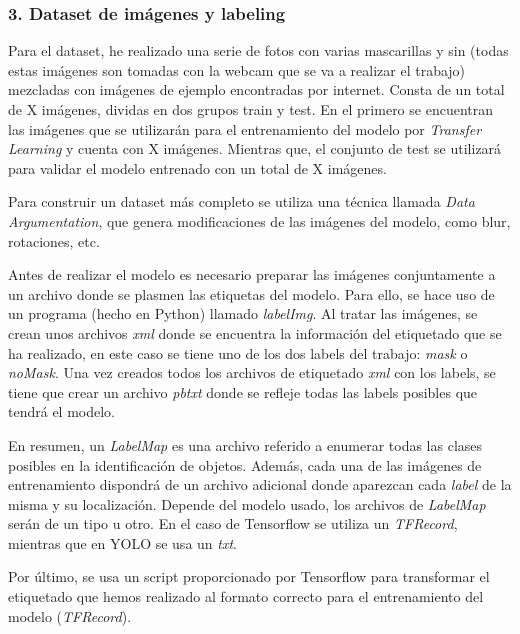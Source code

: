 \vspace{-0.5cm}
\subsubsection*{3. Dataset de imágenes y labeling}
\vspace{-0.7cm}
Para el dataset, he realizado una serie de fotos con varias mascarillas y sin (todas estas imágenes son tomadas con la webcam que se va a realizar el trabajo) mezcladas con imágenes de ejemplo encontradas por internet. Consta de un total de X imágenes, dividas en dos grupos train y test. En el primero se encuentran las imágenes que se utilizarán para el entrenamiento del modelo por \textit{Transfer Learning} y cuenta con X imágenes. Mientras que, el conjunto de test se utilizará para validar el modelo entrenado con un total de X imágenes.

Para construir un dataset más completo se utiliza una técnica llamada \textit{Data Argumentation}, que genera modificaciones de las imágenes del modelo, como blur, rotaciones, etc.

Antes de realizar el modelo es necesario preparar las imágenes conjuntamente a un archivo donde se plasmen las etiquetas del modelo. Para ello, se hace uso de un programa (hecho en Python) llamado \textit{labelImg}. Al tratar las imágenes, se crean unos archivos \textit{xml} donde se encuentra la información del etiquetado que se ha realizado, en este caso se tiene uno de los dos labels del trabajo: \textit{mask} o \textit{noMask}. Una vez creados todos los archivos de etiquetado \textit{xml} con los labels, se tiene que crear un archivo \textit{pbtxt} donde se refleje todas las labels posibles que tendrá el modelo.

En resumen, un \textit{LabelMap} es una archivo referido a enumerar todas las clases posibles en la identificación de objetos. Además, cada una de las imágenes de entrenamiento dispondrá de un archivo adicional donde aparezcan cada \textit{label} de la misma y su localización. Depende del modelo usado, los archivos de \textit{LabelMap} serán de un tipo u otro. En el caso de Tensorflow se utiliza un \textit{TFRecord}, mientras que en YOLO se usa un \textit{txt}.

Por último, se usa un script proporcionado por Tensorflow para transformar el etiquetado que hemos realizado al formato correcto para el entrenamiento del modelo (\textit{TFRecord}).


